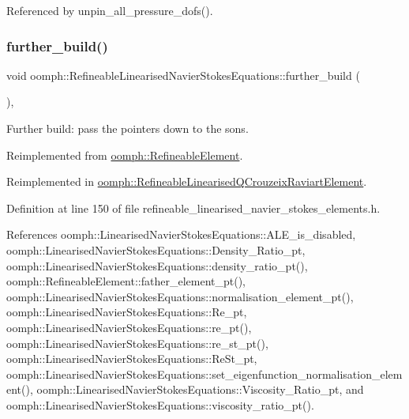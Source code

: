 Referenced by unpin\+\_\+all\+\_\+pressure\+\_\+dofs().

\mbox{\label{classoomph_1_1RefineableLinearisedNavierStokesEquations_a4a160cd28d0a5a865884fd9f27254a2d}} 
\subsubsection{\texorpdfstring{further\+\_\+build()}{further\_build()}}
{\footnotesize\ttfamily void oomph\+::\+Refineable\+Linearised\+Navier\+Stokes\+Equations\+::further\+\_\+build (\begin{DoxyParamCaption}{ }\end{DoxyParamCaption})\hspace{0.3cm}{\ttfamily [inline]}, {\ttfamily [virtual]}}



Further build\+: pass the pointers down to the sons. 



Reimplemented from \hyperlink{classoomph_1_1RefineableElement_a26628ce36dfad028686adeb4694a9ef3}{oomph\+::\+Refineable\+Element}.



Reimplemented in \hyperlink{classoomph_1_1RefineableLinearisedQCrouzeixRaviartElement_a175965274f4f4545e086d19f446c9ce9}{oomph\+::\+Refineable\+Linearised\+Q\+Crouzeix\+Raviart\+Element}.



Definition at line 150 of file refineable\+\_\+linearised\+\_\+navier\+\_\+stokes\+\_\+elements.\+h.



References oomph\+::\+Linearised\+Navier\+Stokes\+Equations\+::\+A\+L\+E\+\_\+is\+\_\+disabled, oomph\+::\+Linearised\+Navier\+Stokes\+Equations\+::\+Density\+\_\+\+Ratio\+\_\+pt, oomph\+::\+Linearised\+Navier\+Stokes\+Equations\+::density\+\_\+ratio\+\_\+pt(), oomph\+::\+Refineable\+Element\+::father\+\_\+element\+\_\+pt(), oomph\+::\+Linearised\+Navier\+Stokes\+Equations\+::normalisation\+\_\+element\+\_\+pt(), oomph\+::\+Linearised\+Navier\+Stokes\+Equations\+::\+Re\+\_\+pt, oomph\+::\+Linearised\+Navier\+Stokes\+Equations\+::re\+\_\+pt(), oomph\+::\+Linearised\+Navier\+Stokes\+Equations\+::re\+\_\+st\+\_\+pt(), oomph\+::\+Linearised\+Navier\+Stokes\+Equations\+::\+Re\+St\+\_\+pt, oomph\+::\+Linearised\+Navier\+Stokes\+Equations\+::set\+\_\+eigenfunction\+\_\+normalisation\+\_\+element(), oomph\+::\+Linearised\+Navier\+Stokes\+Equations\+::\+Viscosity\+\_\+\+Ratio\+\_\+pt, and oomph\+::\+Linearised\+Navier\+Stokes\+Equations\+::viscosity\+\_\+ratio\+\_\+pt().



